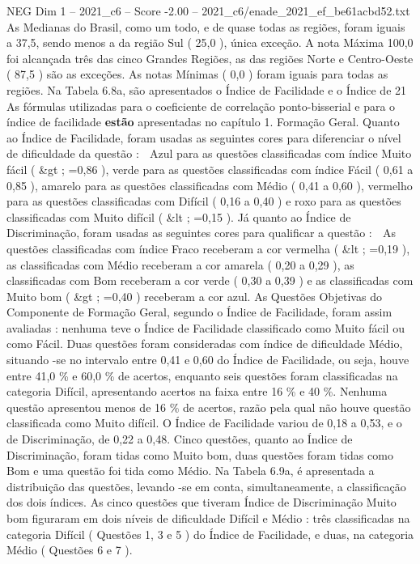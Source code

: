 \begin{textsample}{NEG Dim 1 – 2021\_c6 – Score -2.00 – 2021\_c6/enade\_2021\_ef\_be61acbd52.txt}
As Medianas do Brasil, como um todo, e de quase todas as regiões, foram iguais a 37,5, sendo menos a da região Sul ( 25,0 ), única exceção.
A nota Máxima 100,0 foi alcançada três das cinco Grandes Regiões, as das regiões Norte e Centro-Oeste ( 87,5 ) são as exceções.
As notas Mínimas ( 0,0 ) foram iguais para todas as regiões.
Na Tabela 6.8a, são apresentados o Índice de Facilidade e o Índice de 21 As fórmulas utilizadas para o coeficiente de correlação ponto-bisserial e para o índice de facilidade \textbf{estão} apresentadas no capítulo 1.
Formação Geral.
Quanto ao Índice de Facilidade, foram usadas as seguintes cores para diferenciar o nível de dificuldade da questão :  Azul para as questões classificadas com índice Muito fácil ( \&gt ; =0,86 ), verde para as questões classificadas com índice Fácil ( 0,61 a 0,85 ), amarelo para as questões classificadas com Médio ( 0,41 a 0,60 ), vermelho para as questões classificadas com Difícil ( 0,16 a 0,40 ) e roxo para as questões classificadas com Muito difícil ( \&lt ; =0,15 ).
Já quanto ao Índice de Discriminação, foram usadas as seguintes cores para qualificar a questão :  As questões classificadas com índice Fraco receberam a cor vermelha ( \&lt ; =0,19 ), as classificadas com Médio receberam a cor amarela ( 0,20 a 0,29 ), as classificadas com Bom receberam a cor verde ( 0,30 a 0,39 ) e as classificadas com Muito bom ( \&gt ; =0,40 ) receberam a cor azul.
As Questões Objetivas do Componente de Formação Geral, segundo o Índice de Facilidade, foram assim avaliadas : nenhuma teve o Índice de Facilidade classificado como Muito fácil ou como Fácil.
Duas questões foram consideradas com índice de dificuldade Médio, situando -se no intervalo entre 0,41 e 0,60 do Índice de Facilidade, ou seja, houve entre 41,0 \% e 60,0 \% de acertos, enquanto seis questões foram classificadas na categoria Difícil, apresentando acertos na faixa entre 16 \% e 40 \%.
Nenhuma questão apresentou menos de 16 \% de acertos, razão pela qual não houve questão classificada como Muito difícil.
O Índice de Facilidade variou de 0,18 a 0,53, e o de Discriminação, de 0,22 a 0,48.
Cinco questões, quanto ao Índice de Discriminação, foram tidas como Muito bom, duas questões foram tidas como Bom e uma questão foi tida como Médio.
Na Tabela 6.9a, é apresentada a distribuição das questões, levando -se em conta, simultaneamente, a classificação dos dois índices.
As cinco questões que tiveram Índice de Discriminação Muito bom figuraram em dois níveis de dificuldade Difícil e Médio : três classificadas na categoria Difícil ( Questões 1, 3 e 5 ) do Índice de Facilidade, e duas, na categoria Médio ( Questões 6 e 7 ).

\end{textsample}
